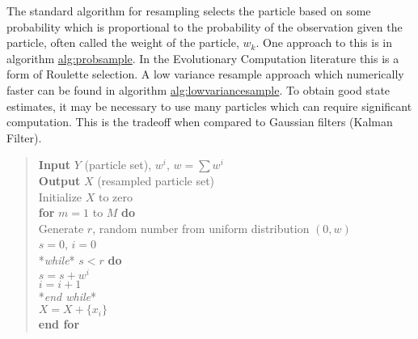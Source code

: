 The standard algorithm for resampling selects the particle based on some
probability which is proportional to the probability of the observation
given the particle, often called the weight of the particle, \(w_k\).
One approach to this is in algorithm
\href{..\%20topic::\%20\%20Resample\%20algorithm.\%20\%20Uses\%20the\%20particle\%20weights\%20to\%20set\%20the\%20sampling\%20probability.}{alg:probsample}.
In the Evolutionary Computation literature this is a form of Roulette
selection. A low variance resample approach which numerically faster can
be found in algorithm
\href{..\%20topic::\%20\%20Low\%20variance\%20resample\%20algorithm.\%20\%20This\%20algorithm\%20runs\%20faster\%20than\%20the\%20previous\%20resample\%20approach.}{alg:lowvariancesample}.
To obtain good state estimates, it may be necessary to use many
particles which can require significant computation. This is the
tradeoff when compared to Gaussian filters (Kalman Filter).

\begin{quote}
\textbf{Input} \(Y\) (particle set), \(w^i\), \(w = \sum w^i\)\\
\textbf{Output} \(X\) (resampled particle set)\\
Initialize \(X\) to zero\\
\textbf{for} \(m=1\) to \(M\) \textbf{do}\\
\hspace*{0.333em}\hspace*{0.333em}Generate \(r\), random number from
uniform distribution \((0,w)\)\\
\hspace*{0.333em}\hspace*{0.333em}\(s = 0\), \(i = 0\)\\
\hspace*{0.333em}\hspace*{0.333em}*\emph{while}* \(s < r\) \textbf{do}\\
\hspace*{0.333em}\hspace*{0.333em}\hspace*{0.333em}\hspace*{0.333em}\(s = s + w^i\)\\
\hspace*{0.333em}\hspace*{0.333em}\hspace*{0.333em}\hspace*{0.333em}\(i = i+1\)\\
\hspace*{0.333em}\hspace*{0.333em}*\emph{end while}*\\
\hspace*{0.333em}\hspace*{0.333em}\(X = X + \{x_i\}\)\\
\textbf{end for}
\end{quote}

